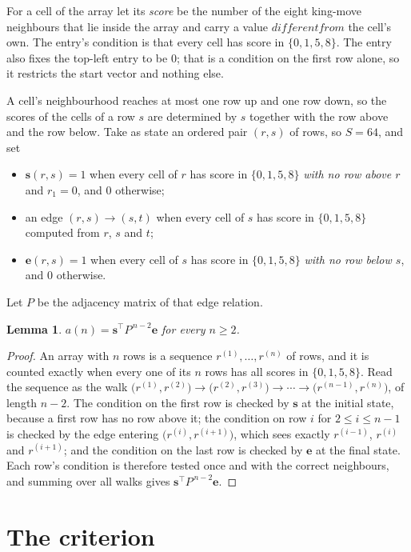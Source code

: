 \documentclass[11pt,a4paper]{article}
\theoremstyle{plain}
\newtheorem{lemma}[theorem]{Lemma}
\theoremstyle{definition}
\begin{document}
For a cell of the array let its \emph{score} be the number of the eight king-move neighbours that lie inside
the array and carry a value $different from$ the cell's own. The entry's condition is that every cell
has score in $\{0,1,5,8\}$. The entry also fixes the top-left entry to be $0$; that is a condition on the first row alone, so it restricts the start vector and nothing else.

A cell's neighbourhood reaches at most one row up and one row down, so the scores of the
cells of a row $s$ are determined by $s$ together with the row above and the row below.
Take as state an ordered pair $(r,s)$ of rows, so $S=64$, and set
\begin{itemize}
\item $\mathbf{s}(r,s)=1$ when every cell of $r$ has score in $\{0,1,5,8\}$ \emph{with no row
above $r$} and $r_1=0$, and $0$ otherwise;
\item an edge $(r,s)\to(s,t)$ when every cell of $s$ has score in $\{0,1,5,8\}$ computed from
$r$, $s$ and $t$;
\item $\mathbf{e}(r,s)=1$ when every cell of $s$ has score in $\{0,1,5,8\}$ \emph{with no row
below $s$}, and $0$ otherwise.
\end{itemize}
Let $P$ be the adjacency matrix of that edge relation.

\begin{lemma}\label{lem:walk}
$a(n)=\mathbf{s}^{\!\top}P^{\,n-2}\mathbf{e}$ for every $n\ge2$.
\end{lemma}

\begin{proof}
An array with $n$ rows is a sequence $r^{(1)},\dots,r^{(n)}$ of rows, and it is counted
exactly when every one of its $n$ rows has all scores in $\{0,1,5,8\}$. Read the sequence as the
walk $\bigl(r^{(1)},r^{(2)}\bigr)\to\bigl(r^{(2)},r^{(3)}\bigr)\to\cdots\to
\bigl(r^{(n-1)},r^{(n)}\bigr)$, of length $n-2$. The condition on the first row is
checked by $\mathbf{s}$ at the initial state, because a first row has no row above it; the
condition on row $i$ for $2\le i\le n-1$ is checked by the edge entering
$\bigl(r^{(i)},r^{(i+1)}\bigr)$, which sees exactly $r^{(i-1)}$, $r^{(i)}$ and
$r^{(i+1)}$; and the condition on the last row is checked by $\mathbf{e}$ at the final
state. Each row's condition is therefore tested once and with the correct neighbours, and
summing over all walks gives $\mathbf{s}^{\!\top}P^{\,n-2}\mathbf{e}$.
\end{proof}

\section{The criterion}
\end{document}
